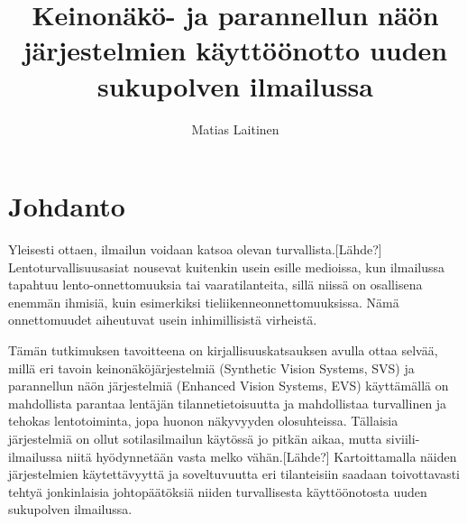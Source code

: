 \documentclass[utf8,bachelor,manualbib]{gradu3}
\begin{document}
\title{Keinonäkö- ja parannellun näön järjestelmien käyttöönotto uuden sukupolven ilmailussa}



\author{Matias Laitinen}

\maketitle
  
\mainmatter

\chapter{Johdanto}

Yleisesti ottaen, ilmailun voidaan katsoa olevan turvallista.[Lähde?] Lentoturvallisuusasiat nousevat kuitenkin usein esille medioissa, kun ilmailussa tapahtuu lento-onnettomuuksia tai vaaratilanteita, sillä niissä on osallisena enemmän ihmisiä, kuin esimerkiksi tieliikenneonnettomuuksissa. Nämä onnettomuudet aiheutuvat usein inhimillisistä virheistä.

Tämän tutkimuksen tavoitteena on kirjallisuuskatsauksen avulla ottaa selvää, millä eri tavoin keinonäköjärjestelmiä (Synthetic Vision Systems, SVS) ja parannellun näön järjestelmiä (Enhanced Vision Systems, EVS) käyttämällä on mahdollista parantaa lentäjän tilannetietoisuutta ja mahdollistaa turvallinen ja tehokas lentotoiminta, jopa huonon näkyvyyden olosuhteissa. Tällaisia järjestelmiä on ollut sotilasilmailun käytössä jo pitkän aikaa, mutta siviili-ilmailussa niitä hyödynnetään vasta melko vähän.[Lähde?] Kartoittamalla näiden järjestelmien käytettävyyttä ja soveltuvuutta eri tilanteisiin saadaan toivottavasti tehtyä jonkinlaisia johtopäätöksiä niiden turvallisesta käyttöönotosta uuden sukupolven ilmailussa.
\end{document}
